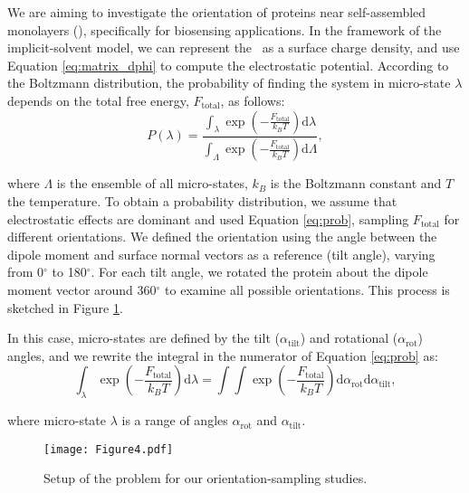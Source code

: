 
We are aiming to investigate the orientation of proteins near self-assembled monolayers (\sam), specifically for biosensing applications. In the framework of the implicit-solvent model, we can represent the \sam\ as a surface charge density, and use Equation \eqref{eq:matrix_dphi} to compute the electrostatic potential. 
According to the Boltzmann distribution, the probability of finding the system in micro-state $\lambda$ depends on the total free energy, $F_\text{total}$, as follows:
%
\begin{equation} \label{eq:prob}
P(\lambda) = \frac{\int_{\lambda} \exp \left(-\frac{F_\text{total}}{k_B T} \right) \text{d} \lambda}{\int_{\Lambda} \exp \left(-\frac{F_\text{total}}{k_B T} \right) \text{d} \Lambda},
\end{equation} 

\noindent where $\Lambda$ is the ensemble of all micro-states, $k_B$ is the Boltzmann constant and $T$ the temperature. To obtain a probability distribution, we assume that electrostatic effects are dominant and used Equation \eqref{eq:prob}, sampling $F_\text{total}$ for different orientations. We defined the orientation using the angle between the dipole moment and surface normal vectors as a reference (tilt angle), varying from 0$^\circ$ to 180$^\circ$. For each tilt angle, we rotated the protein about the dipole moment vector around 360$^\circ$ to examine all possible orientations. This process is sketched in Figure \ref{fig:1pgb_orientation}.

In this case, micro-states are defined by the tilt ($\alpha_{\text{tilt}}$) and rotational ($\alpha_{\text{rot}}$) angles, and we rewrite the integral in the numerator of Equation \eqref{eq:prob} as:
%
\begin{equation} \label{eq:prob_angle}
\int_{\lambda} \exp \left(-\frac{F_\text{total}}{k_B T} \right) \text{d} \lambda = \int \int \exp \left(-\frac{F_\text{total}}{k_B T} \right) \text{d} \alpha_{\text{rot}} \text{d} \alpha_{\text{tilt}},
\end{equation}

\noindent where micro-state $\lambda$ is a range of angles $\alpha_{\text{rot}}$ and $\alpha_{\text{tilt}}$. 


\begin{figure}%
   \centering
   \texttt{[image: Figure4.pdf]}
   \caption{Setup of the problem for our orientation-sampling studies.}
   \label{fig:1pgb_orientation}
\end{figure}

